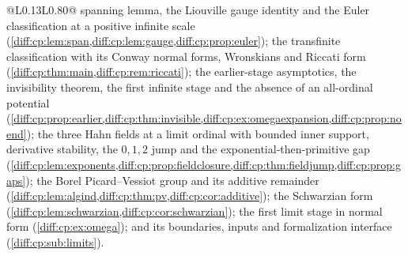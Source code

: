 \documentclass[11pt,letterpaper]{article}
\numberwithin{equation}{section}
\theoremstyle{definition}
\theoremstyle{remark}
\begin{document}
\begin{longtable}{@{}L{0.13\textwidth}L{0.80\textwidth}@{}}
spanning lemma, the Liouville gauge identity and the Euler classification at a
positive infinite scale (\cref{diff:cp:lem:span,diff:cp:lem:gauge,diff:cp:prop:euler});
the transfinite classification with its Conway normal forms, Wronskians and
Riccati form (\cref{diff:cp:thm:main,diff:cp:rem:riccati}); the earlier-stage
asymptotics, the invisibility theorem, the first infinite stage and the absence
of an all-ordinal potential
(\cref{diff:cp:prop:earlier,diff:cp:thm:invisible,diff:cp:ex:omegaexpansion,diff:cp:prop:noend});
the three Hahn fields at a limit ordinal with bounded inner support, derivative
stability, the $0,1,2$ jump and the exponential-then-primitive gap
(\cref{diff:cp:lem:exponents,diff:cp:prop:fieldclosure,diff:cp:thm:fieldjump,diff:cp:prop:gaps});
the Borel Picard--Vessiot group and its additive remainder
(\cref{diff:cp:lem:algind,diff:cp:thm:pv,diff:cp:cor:additive}); the Schwarzian
form (\cref{diff:cp:lem:schwarzian,diff:cp:cor:schwarzian}); the first limit
stage in normal form (\cref{diff:cp:ex:omega}); and its boundaries, inputs and
formalization interface (\cref{diff:cp:sub:limits}). \\
\bottomrule
\end{longtable}
\end{document}
